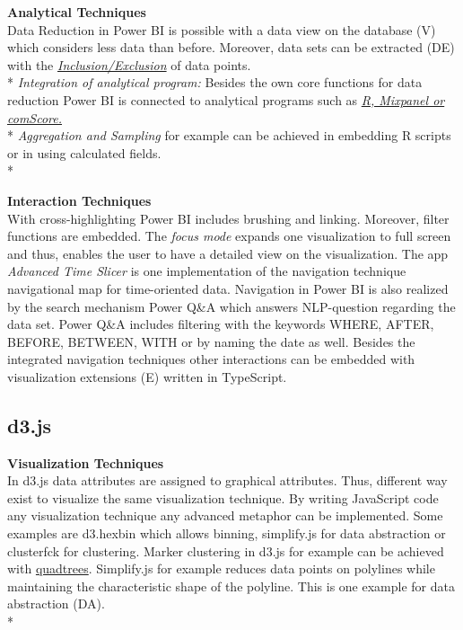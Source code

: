 \textbf{Analytical Techniques}\\
Data Reduction in Power BI is possible with a data view on the database (V) which considers less data than before. Moreover, data sets can be extracted (DE) with the \hyperlink{https://Power BI.microsoft.com/de-de/blog/power-bi-desktop-october-feature-summary/#grouping}{\textit{Inclusion/Exclusion}} of data points.\\*
\textit{Integration of analytical program:} Besides the own core functions for data reduction Power BI is connected to analytical programs such as \hyperlink{https://Power BI.microsoft.com/de-de/blog/power-bi-desktop-october-feature-summary/#grouping}{\textit{R, Mixpanel or comScore.}}\\*
\textit{Aggregation and Sampling} for example can be achieved in embedding R scripts or in using calculated fields. \\*

\textbf{Interaction Techniques}\\
With cross-highlighting Power BI includes brushing and linking\cite{Power BIInteract}. Moreover, filter functions are embedded. The \textit{focus mode} expands one visualization to full screen and thus, enables the user to have a detailed view on the visualization. The app \textit{Advanced Time Slicer} is one implementation of the navigation technique navigational map for time-oriented data. Navigation in Power BI is also realized by the search mechanism Power Q&A which answers NLP-question regarding the data set. Power Q&A includes filtering with the keywords WHERE, AFTER, BEFORE, BETWEEN, WITH or by naming the date as well. Besides the integrated navigation techniques other interactions can be embedded with visualization extensions (E) written in TypeScript.
\newpage
\subsection*{d3.js}
\textbf{Visualization Techniques}\\
In d3.js data attributes are assigned to graphical attributes. Thus, different way exist to visualize the same visualization technique. By writing JavaScript code any visualization technique any advanced metaphor can be implemented. Some examples are d3.hexbin which allows binning,  simplify.js for data abstraction or clusterfck for clustering.  
Marker clustering in d3.js for example can be achieved with \href{https://www.phase2technology.com/blog/using-d3-quadtrees-to-power-an-interactive-map-for-bonnier-corporation/}{quadtrees}\cite{Morrison2014}. Simplify.js for example reduces data points on polylines while maintaining the characteristic shape of the polyline. This is one example for data abstraction (DA).\\*

